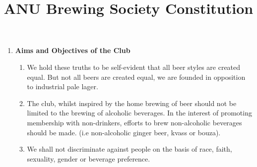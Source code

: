 \documentclass{article}
\title{ANU Brewing Society Constitution}
\author{}
\date{}
\begin{document}
\maketitle

\begin{enumerate}[label=\textbf{\arabic*}]
    \item \textbf{Aims and Objectives of the Club}
    \begin{enumerate}[label=1.\arabic*]
        \item We hold these truths to be self-evident that all beer styles are created equal. But not all beers are created equal, we are founded in opposition to industrial pale lager.
        \item The club, whilst inspired by the home brewing of beer should not be limited to the brewing of alcoholic beverages. In the interest of promoting membership with non-drinkers, efforts to brew non-alcoholic beverages should be made. (i.e non-alcoholic ginger beer, kvass or bouza).
        \item We shall not discriminate against people on the basis of race, faith, sexuality, gender or beverage preference.
    \end{enumerate}


\end{enumerate}
\end{document}
